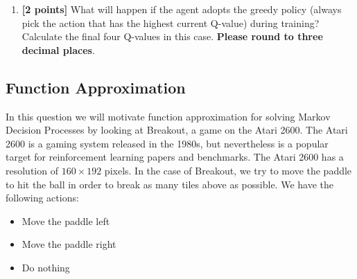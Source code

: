 \begin{enumerate}
\begin{tcolorbox}[fit,height=3cm, width=\linewidth, blank, borderline={1pt}{-2pt},nobeforeafter]
\end{tcolorbox}


\clearpage
\item \textbf{[2 points]} What will happen if the agent adopts the greedy policy (always pick the action that has the highest current Q-value) during training? Calculate the final four Q-values in this case. \textbf{Please round to three decimal places}.

\begin{tcolorbox}[fit,height=3cm, width=\linewidth, blank, borderline={1pt}{-2pt},nobeforeafter]
\end{tcolorbox}


\end{enumerate}

\clearpage

\subsection{Function Approximation }
\label{sec:FA}
In this question we will motivate function approximation for solving Markov Decision Processes by looking at Breakout, a game on the Atari 2600. The Atari 2600 is a gaming system released in the 1980s, but nevertheless is a popular target for reinforcement learning papers and benchmarks. The Atari 2600 has a resolution of $160 \times 192$ pixels. In the case of Breakout, we try to move the paddle to hit the ball in order to break as many tiles above as possible. We have the following actions:
\begin{itemize}
    \item Move the paddle left
    \item Move the paddle right
    \item Do nothing
\end{itemize}

